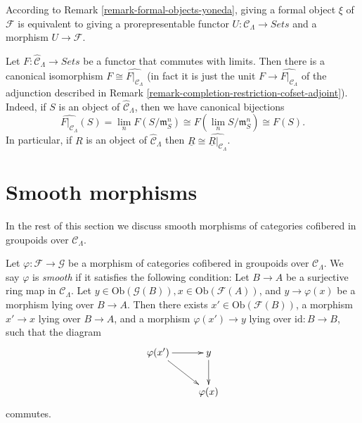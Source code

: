 \begin{remark}
\label{remark-spell-out-formal-object}
According to Remark \ref{remark-formal-objects-yoneda}, giving a formal object 
$\xi$ of $\mathcal{F}$ is equivalent to giving a prorepresentable functor $U: 
\mathcal{C}_\Lambda \to \textit{Sets}$ and a morphism $U 
\to \mathcal{F}$. 
\end{remark}

\begin{remark}
\label{remark-restrict-complete-continuous-functor}
Let $F : \widehat{\mathcal{C}}_\Lambda \to \textit{Sets}$ be a 
functor that commutes with limits.  Then there is a canonical isomorphism $F 
\cong \widehat{F|_{\mathcal{C}_\Lambda}}$ (in fact it is just the unit $F 
\to \widehat{F|_{\mathcal{C}_\Lambda}}$ of the adjunction described in 
Remark \ref{remark-completion-restriction-cofset-adjoint}).  Indeed, if $S$ is 
an object of $\widehat{\mathcal{C}}_\Lambda$, then we have canonical bijections
\[ \widehat{F|_{\mathcal{C}_\Lambda}}(S) = \lim_{n} F(S/\mathfrak{m}_{S}^n) 
\cong F(\lim_{n} S/\mathfrak{m}_{S}^n) \cong F(S). \]
In particular, if $R$ is an object of $\widehat{\mathcal{C}}_\Lambda$ then 
$\underline{R} \cong \widehat{\underline{R}|_{\mathcal{C}_\Lambda}}$.
\end{remark}




\section{Smooth morphisms}
\label{section-smooth-morphisms}

\noindent
In the rest of this section we discuss smooth morphisms of categories 
cofibered in groupoids over $\mathcal{C}_\Lambda$.

\begin{definition}
\label{definition-smooth-morphism}
Let $\varphi: \mathcal{F} \to \mathcal G$ be a morphism of categories 
cofibered in groupoids over $\mathcal{C}_\Lambda$.  We say  $\varphi$ is 
{\it smooth} if it satisfies the following condition: Let $B \to A$ be 
a surjective ring map in $\mathcal{C}_\Lambda$.  Let $y \in 
\text{Ob}(\mathcal G(B)), x \in \text{Ob}(\mathcal{F}(A))$, and $y 
\to \varphi(x)$ be a morphism lying over $B \to A$.  Then there 
exists $x' \in \text{Ob}(\mathcal{F}(B))$, a morphism $x' \to x$ 
lying over $B \to A$, and a morphism $\varphi(x') \to y$ lying 
over $\text{id}: B \to B$, such that the diagram
\[
\xymatrix{
\varphi(x') \ar[r] \ar[dr] & y \ar[d] \\
                        & \varphi(x)
}
\]
commutes.
\end{definition}

